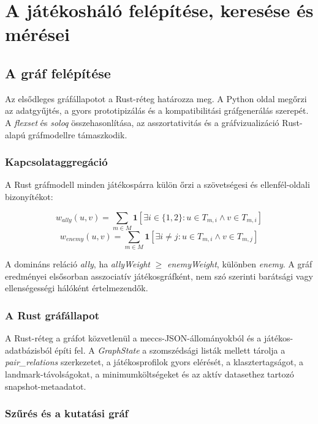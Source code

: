 \chapter{A játékosháló felépítése, keresése és mérései}

\section{A gráf felépítése}

Az elsődleges gráfállapotot a Rust-réteg határozza meg. A Python oldal megőrzi az adatgyűjtés, a gyors prototipizálás és a kompatibilitási gráfgenerálás szerepét. A \textit{flexset} és \textit{soloq} összehasonlítása, az asszortativitás és a gráfvizualizáció Rust-alapú gráfmodellre támaszkodik.

\subsection{Kapcsolataggregáció}

A Rust gráfmodell minden játékospárra külön őrzi a szövetségesi és ellenfél-oldali bizonyítékot:

\begin{equation}
w_{ally}(u,v)=\sum_{m \in M}\mathbf{1}[\exists i \in \{1,2\}: u \in T_{m,i} \land v \in T_{m,i}]
\end{equation}
\begin{equation}
w_{enemy}(u,v)=\sum_{m \in M}\mathbf{1}[\exists i \neq j: u \in T_{m,i} \land v \in T_{m,j}]
\end{equation}

A domináns reláció \textit{ally}, ha \textit{allyWeight} $\geq$ \textit{enemyWeight}, különben \textit{enemy}. A gráf eredményei elsősorban asszociatív játékosgráfként, nem szó szerinti barátsági vagy ellenségességi hálóként értelmezendők.

\subsection{A Rust gráfállapot}

A Rust-réteg a gráfot közvetlenül a meccs-JSON-állományokból és a játékos-adatbázisból építi fel. A \textit{GraphState} a szomszédsági listák mellett tárolja a \textit{pair\_relations} szerkezetet, a játékosprofilok gyors elérését, a klasztertagságot, a landmark-távolságokat, a minimumköltségeket és az aktív datasethez tartozó snapshot-metaadatot.

\subsection{Szűrés és a kutatási gráf}

